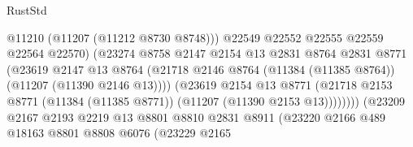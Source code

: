 \begin{lexlean}{RustStd}
\begin{coremodule}
                                            @11210
                                            (@11207 (@11212 @8730 @8748)))
                                          @22549
                                          @22552
                                          @22555
                                          @22559
                                          @22564
                                          @22570)
                                        (@23274
                                          @8758
                                          @2147
                                          @2154
                                          @13
                                          @2831
                                          @8764
                                          @2831
                                          @8771
                                          (@23619
                                            @2147
                                            @13
                                            @8764
                                            (@21718
                                              @2146
                                              @8764
                                              (@11384 (@11385 @8764))
                                              (@11207 (@11390 @2146 @13))))
                                          (@23619
                                            @2154
                                            @13
                                            @8771
                                            (@21718
                                              @2153
                                              @8771
                                              (@11384 (@11385 @8771))
                                              (@11207 (@11390 @2153 @13))))))))
                                  (@23209
                                    @2167
                                    @2193
                                    @2219
                                    @13
                                    @8801
                                    @8810
                                    @2831
                                    @8911
                                    (@23220
                                      @2166
                                      @489
                                      @18163
                                      @8801
                                      @8808
                                      @6076
                                      (@23229
                                        @2165

\end{coremodule}
\end{lexlean}
